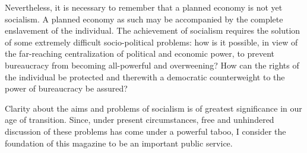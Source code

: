 \documentclass[12pt]{article}
\begin{document}
Nevertheless, it is necessary to remember that a planned economy is not yet socialism. A planned economy as such may be accompanied by the complete enslavement of the individual. The achievement of socialism requires the solution of some extremely difficult socio-political problems: how is it possible, in view of the far-reaching centralization of political and economic power, to prevent bureaucracy from becoming all-powerful and overweening? How can the rights of the individual be protected and therewith a democratic counterweight to the power of bureaucracy be assured?

Clarity about the aims and problems of socialism is of greatest significance in our age of transition. Since, under present circumstances, free and unhindered discussion of these problems has come under a powerful taboo, I consider the foundation of this magazine to be an important public service.
\end{document}
